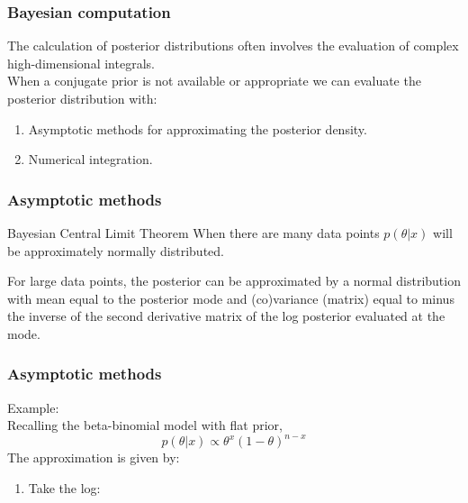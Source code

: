 \documentclass{beamer}
\newcommand{\1}{\ensuremath{\mathbf{1}}}
\begin{document}
%
%
%
\begin{frame}\frametitle{Bayesian computation}
	The calculation of posterior distributions often involves the evaluation of complex high-dimensional integrals.\\[2ex]
	When a conjugate prior is not available or appropriate we can evaluate the posterior distribution with:
	\begin{enumerate}
		\item Asymptotic methods for approximating the posterior density.
		\item Numerical integration.
	\end{enumerate}
\end{frame}
%
%
%
\begin{frame}\frametitle{Asymptotic methods}
	\begin{block}{Bayesian Central Limit Theorem}
		When there are many data points $p(\theta|x)$ will be approximately normally distributed.
	\end{block}
	For large data points, the posterior can be approximated by a normal distribution with mean equal to the posterior mode and (co)variance (matrix) equal to minus the inverse of the second derivative matrix of the log posterior evaluated at the mode.
\end{frame}
%
%
%
\begin{frame}\frametitle{Asymptotic methods}
	Example:\\
	Recalling the beta-binomial model with flat prior,\\
	\begin{equation}
		p(\theta|x) \propto \theta^x (1-\theta)^{n-x}
	\end{equation}
	The approximation is given by:
	\begin{enumerate}
		\item Take the log: \visible<2-5>{$l(\theta) = x \log\theta + (n-x) \log(1-\theta)$}
	\end{enumerate}
\end{frame}
\end{document}
